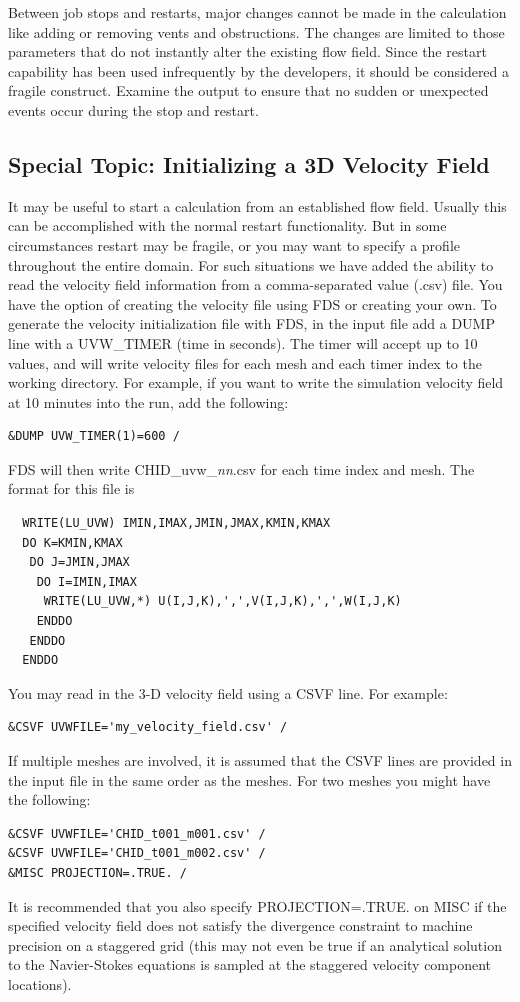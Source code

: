 \documentclass[11pt]{book}
\begin{document}
Between job stops and restarts, major changes cannot be made in the calculation
like adding or removing vents and obstructions. The changes are limited to those parameters that do
not instantly alter the existing flow field. Since the restart
capability has been used infrequently by the developers, it should be considered
a fragile construct. Examine the output
to ensure that no sudden or unexpected events occur during the stop and
restart.


\subsection{Special Topic: Initializing a 3D Velocity Field}
\label{info:velo_restart}
\label{info:CSVF}

It may be useful to start a calculation from an established flow field.  Usually this can be accomplished with the normal restart functionality.  But in some circumstances restart may be fragile, or you may want to specify a profile throughout the entire domain.  For such situations we have added the ability to read the velocity field information from a comma-separated value (.csv) file.  You have the option of creating the velocity file using FDS or creating your own.  To generate the velocity initialization file with FDS, in the input file add a {\ct DUMP} line with a {\ct UVW\_TIMER} (time in seconds).  The timer will accept up to 10 values, and will write velocity files for each mesh and each timer index to the working directory.  For example, if you want to write the simulation velocity field at 10 minutes into the run, add the following:
\begin{lstlisting}
&DUMP UVW_TIMER(1)=600 /
\end{lstlisting}
FDS will then write {\ct CHID\_uvw\_{\it nn}.csv} for each time index and mesh.  The format for this file is
\begin{lstlisting}
  WRITE(LU_UVW) IMIN,IMAX,JMIN,JMAX,KMIN,KMAX
  DO K=KMIN,KMAX
   DO J=JMIN,JMAX
    DO I=IMIN,IMAX
     WRITE(LU_UVW,*) U(I,J,K),',',V(I,J,K),',',W(I,J,K)
    ENDDO
   ENDDO
  ENDDO
\end{lstlisting}
You may read in the 3-D velocity field using a {\ct CSVF} line.  For example:
\begin{lstlisting}
&CSVF UVWFILE='my_velocity_field.csv' /
\end{lstlisting}
If multiple meshes are involved, it is assumed that the {\ct CSVF} lines are provided in the input file in the same order as the meshes. For two meshes you might have the following:
\begin{lstlisting}
&CSVF UVWFILE='CHID_t001_m001.csv' /
&CSVF UVWFILE='CHID_t001_m002.csv' /
&MISC PROJECTION=.TRUE. /
\end{lstlisting}
It is recommended that you also specify {\ct PROJECTION=.TRUE.} on {\ct MISC} if the specified velocity field does not satisfy the divergence constraint to machine precision on a staggered grid (this may not even be true if an analytical solution to the Navier-Stokes equations is sampled at the staggered velocity component locations).
\end{document}
